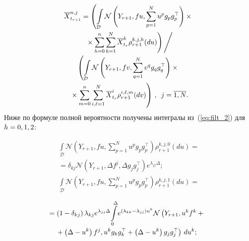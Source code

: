 \begin{multicols}{2}
 \noindent
 \begin{multline}
 \overline{X}_{t_{r+1}}^{n,j} = 
 \left(
 \int\limits_{\mathcal{D}} 
 \mathcal{N}\left(Y_{r+1},f u,\sum\limits_{p=1}^N u^p g_pg_p^{\top}\right)\times{}\right.\\[-1pt]
\left.{}\times \sum\limits_{h=0}^{n}\sum\limits_{k=1}^N \overline{X}_{t_r}^k
 \rho^{k,j,h}_{r+1}(du)
 \right)\Bigg/ \\[-1pt]
 \left(
 \int\limits_{\mathcal{D}} 
 \mathcal{N}\left(Y_{r+1},f v,\sum\limits_{q=1}^N v^q g_qg_q^{\top}\right)\times{}\right.\\[-1pt]
\left. {}\times
 \sum\limits_{m=0}^{n}
 \sum\limits_{i,\ell=1}^N \overline{X}_{t_r}^i
 \rho^{i,\ell,m}_{r+1}(dv)
  \right)\,, \enskip
   j = \overline{1,N}.
  \label{eq:filt_2}
 \end{multline}
 Ниже по формуле полной вероятности получены интегралы из~(\ref{eq:filt_2}) для 
 $h\hm=0,1,2$:
 
\vspace*{-3pt}

 \noindent
  \begin{multline*}
 \int\limits_{\mathcal{D}}  \mathcal{N}
 \left(Y_{r+1},f u,\sum\limits_{p=1}^N u^p g_pg_p^{\top}\right) 
 \rho^{k,j,0}_{r+1}(du) = {}\\[-1pt]
 {}=
 \delta_{kj}\mathcal{N}\left(Y_{r+1},\Delta f^j,\Delta g_jg_j^{\top}\right)
 e^{\lambda_{jj}\Delta};
\\[-1pt]
 \int\limits_{\mathcal{D}}  \mathcal{N}\left(
 Y_{r+1},f u,\sum\limits_{p=1}^N u^p g_pg_p^{\top}\right) 
 \rho^{k,j,1}_{r+1}(du) ={} 
 \end{multline*}
 
 \noindent
 \begin{multline}
 \hspace*{-6.7pt}{}=\left(1-\delta_{kj}\right)\lambda_{kj}e^{\lambda_{jj}\Delta}
\! \int\limits_0^{\Delta}\!
 e^{(\lambda_{kk}-\lambda_{jj})u^k}
 \mathcal{N}\left(Y_{r+1},u^kf^k +{}\right.\hspace*{-0.28818pt}\\[-1pt]
\hspace*{-3mm}\left. {}+ \left(\Delta - u^k\right)f^j, u^k g_kg_k^{\top}+
 \left(\Delta-u^k\right)g_jg_j^{\top}\right)\,du^k;
 \label{eq:h1}
 \end{multline}
 
 \vspace*{-12pt}
 

\end{multicols}
